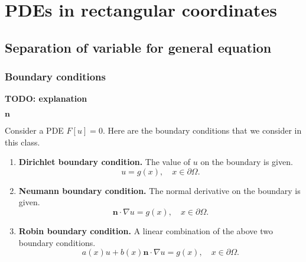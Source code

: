 \section{PDEs in rectangular coordinates}

\subsection{Separation of variable for general equation}

\subsubsection{Boundary conditions}

\textbf{TODO: explanation}

\begin{definition} $\mathbf{n}$
    
\end{definition}

\begin{definition} Consider a PDE $F[u] = 0$. Here are the boundary conditions that we consider in this class.
    \begin{enumerate}
        \item \textbf{Dirichlet boundary condition.} The value of $u$ on the boundary is given.
        \begin{equation}\label{eq.Dirichlet_boundary}
            u=g(x), \quad x \in \partial \Omega .
        \end{equation}
        
        \item \textbf{Neumann boundary condition.} The normal derivative on the boundary is given.
        \begin{equation}\label{eq.Neumann_boundary}
            \mathbf{n} \cdot \nabla u=g(x), \quad x \in \partial \Omega .
        \end{equation}
        
        \item \textbf{Robin boundary condition.} A linear combination of the above two boundary conditions. 
        \begin{equation}\label{eq.Robin_boundary}
            a(x) u+b(x) \mathbf{n} \cdot \nabla u=g(x), \quad x \in \partial \Omega .
        \end{equation}
    \end{enumerate}
\end{definition}

